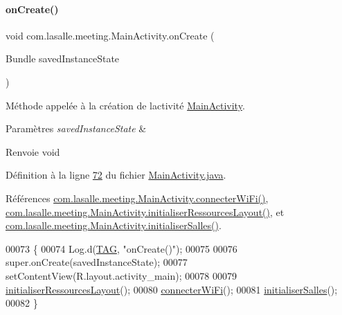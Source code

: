 \paragraph{\texorpdfstring{on\+Create()}{onCreate()}}
{\footnotesize\ttfamily void com.\+lasalle.\+meeting.\+Main\+Activity.\+on\+Create (\begin{DoxyParamCaption}\item[{Bundle}]{saved\+Instance\+State }\end{DoxyParamCaption})\hspace{0.3cm}{\ttfamily [protected]}}



Méthode appelée à la création de l\textquotesingle{}activité \hyperlink{classcom_1_1lasalle_1_1meeting_1_1_main_activity}{Main\+Activity}. 


\begin{DoxyParams}{Paramètres}
{\em saved\+Instance\+State} & \\
\hline
\end{DoxyParams}
\begin{DoxyReturn}{Renvoie}
void 
\end{DoxyReturn}


Définition à la ligne \hyperlink{_main_activity_8java_source_l00072}{72} du fichier \hyperlink{_main_activity_8java_source}{Main\+Activity.\+java}.



Références \hyperlink{_main_activity_8java_source_l00185}{com.\+lasalle.\+meeting.\+Main\+Activity.\+connecter\+Wi\+Fi()}, \hyperlink{_main_activity_8java_source_l00134}{com.\+lasalle.\+meeting.\+Main\+Activity.\+initialiser\+Ressources\+Layout()}, et \hyperlink{_main_activity_8java_source_l00213}{com.\+lasalle.\+meeting.\+Main\+Activity.\+initialiser\+Salles()}.


\begin{DoxyCode}
00073     \{
00074         Log.d(\hyperlink{classcom_1_1lasalle_1_1meeting_1_1_main_activity_a8f934680ad3a7ec4ad0fea748f0b7506}{TAG}, \textcolor{stringliteral}{"onCreate()"});
00075 
00076         super.onCreate(savedInstanceState);
00077         setContentView(R.layout.activity\_main);
00078 
00079         \hyperlink{classcom_1_1lasalle_1_1meeting_1_1_main_activity_a2622b1b85884f9d66038adfc162b2c30}{initialiserRessourcesLayout}();
00080         \hyperlink{classcom_1_1lasalle_1_1meeting_1_1_main_activity_a8a28bbbc80b8806750b6297222f0bc92}{connecterWiFi}();
00081         \hyperlink{classcom_1_1lasalle_1_1meeting_1_1_main_activity_a9be385d267f1d26e32c21d119bc65343}{initialiserSalles}();
00082     \}
\end{DoxyCode}
\mbox{\label{classcom_1_1lasalle_1_1meeting_1_1_main_activity_a2ea2affb4c84cb17d1bef20c47421d15}} 
